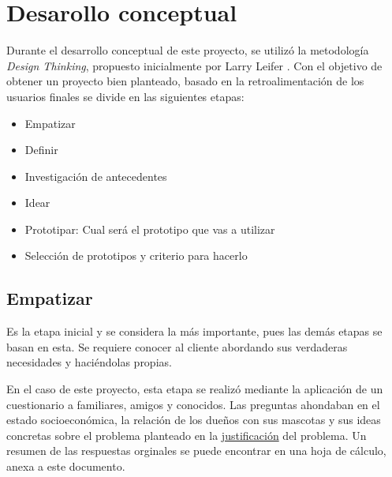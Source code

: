 \documentclass[12pt,a4paper]{proyectoinnovacion}
\begin{document}




\section{Desarollo conceptual}

Durante el desarrollo conceptual de este proyecto, se utilizó la metodología \textit{Design Thinking}, propuesto inicialmente por Larry Leifer \textcite{plattner2011}. Con el objetivo de obtener un proyecto bien planteado, basado en la retroalimentación de los usuarios finales se divide en las siguientes etapas:


\begin{itemize}
  \item Empatizar
  \item Definir
  \item Investigación de antecedentes
  \item Idear
  \item Prototipar: Cual será el prototipo que vas a utilizar
  \item Selección de prototipos y criterio para hacerlo  
\end{itemize}


\subsection{Empatizar}

Es la etapa inicial y se considera la más importante, pues las demás etapas se basan en esta. Se requiere conocer al cliente abordando sus verdaderas necesidades y haciéndolas propias. 

En el caso de este proyecto, esta etapa se realizó mediante la aplicación de un cuestionario a familiares, amigos y conocidos. Las preguntas ahondaban en el estado socioeconómica, la relación de los dueños con sus mascotas y sus ideas concretas sobre el problema planteado en la \hyperref[sec:justificacion]{justificación} del problema. Un resumen de las respuestas orginales se puede encontrar en una hoja de cálculo, anexa a este documento. %
\end{document}
